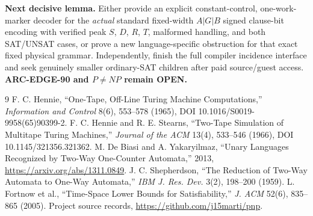 \documentclass[11pt]{article}
\newcommand{\OPEN}{\textbf{OPEN}}
\begin{document}
\textbf{Next decisive lemma.} Either provide an explicit constant-control, one-work-marker decoder for the \emph{actual} standard fixed-width $A|G|B$ signed clause-bit encoding with verified peak $S$, $D$, $R$, $T$, malformed handling, and both SAT/UNSAT cases, or prove a new language-specific obstruction for that exact fixed physical grammar. Independently, finish the full compiler incidence interface and seek genuinely smaller ordinary-SAT children after paid source/guest access. \textbf{ARC-EDGE-90 and $P\ne NP$ remain \OPEN.}
\begin{thebibliography}{9}
 F. C. Hennie, ``One-Tape, Off-Line Turing Machine Computations,'' \emph{Information and Control} 8(6), 553--578 (1965), DOI 10.1016/S0019-9958(65)90399-2.
 F. C. Hennie and R. E. Stearns, ``Two-Tape Simulation of Multitape Turing Machines,'' \emph{Journal of the ACM} 13(4), 533--546 (1966), DOI 10.1145/321356.321362.
 M. De Biasi and A. Yakaryilmaz, ``Unary Languages Recognized by Two-Way One-Counter Automata,'' 2013, \url{https://arxiv.org/abs/1311.0849}.
 J. C. Shepherdson, ``The Reduction of Two-Way Automata to One-Way Automata,'' \emph{IBM J. Res. Dev.} 3(2), 198--200 (1959).
 L. Fortnow et al., ``Time-Space Lower Bounds for Satisfiability,'' \emph{J. ACM} 52(6), 835--865 (2005).
 Project source records, \url{https://github.com/j15marti/pnp}.
\end{thebibliography}
\end{document}
